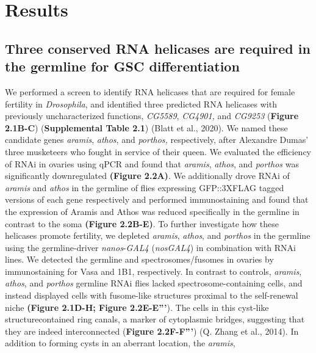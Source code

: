 \documentclass[12pt,oneside]{reedthesis}
\begin{document}
\hypertarget{results}{%
\section{Results}\label{results}}

\hypertarget{three-conserved-rna-helicases-are-required-in-the-germline-for-gsc-differentiation}{%
\subsection{Three conserved RNA helicases are required in the germline for GSC differentiation}\label{three-conserved-rna-helicases-are-required-in-the-germline-for-gsc-differentiation}}

We performed a screen to identify RNA helicases that are required for
female fertility in \emph{Drosophila}, and identified three predicted RNA
helicases with previously uncharacterized functions, \emph{CG5589}, \emph{CG4901,}
and \emph{CG9253} (\textbf{Figure 2.1B-C}) (\textbf{Supplemental Table 2.1})
(Blatt et al., 2020). We named these candidate genes
\emph{aramis}, \emph{athos}, and \emph{porthos,} respectively, after Alexandre Dumas'
three musketeers who fought in service of their queen. We evaluated the
efficiency of RNAi in ovaries using qPCR and found that \emph{aramis},
\emph{athos}, and \emph{porthos} was significantly downregulated \textbf{(Figure 2.2A)}.
We additionally drove RNAi of \emph{aramis} and \emph{athos} in the germline of
flies expressing GFP::3XFLAG tagged versions of each gene respectively
and performed immunostaining and found that the expression of Aramis and
Athos was reduced specifically in the germline in contrast to the soma
\textbf{(Figure 2.2B-E)}. To further investigate how these helicases promote
fertility, we depleted \emph{aramis}, \emph{athos}, and \emph{porthos} in the germline
using the germline-driver \emph{nanos}-\emph{GAL4} (\emph{nosGAL4}) in combination with
RNAi lines. We detected the germline and spectrosomes/fusomes in ovaries
by immunostaining for Vasa and 1B1, respectively. In contrast to
controls, \emph{aramis}, \emph{athos}, and \emph{porthos} germline RNAi flies lacked
spectrosome-containing cells, and instead displayed cells with
fusome-like structures proximal to the self-renewal niche \textbf{(Figure 2.1D-H; Figure 2.2E-E'''}).
The cells in this cyst-like structurecontained ring canals,
a marker of cytoplasmic bridges, suggesting that
they are indeed interconnected (\textbf{Figure 2.2F-F'''}) (Q. Zhang et al., 2014).
In addition to forming cysts in an aberrant location, the \emph{aramis},
\end{document}
